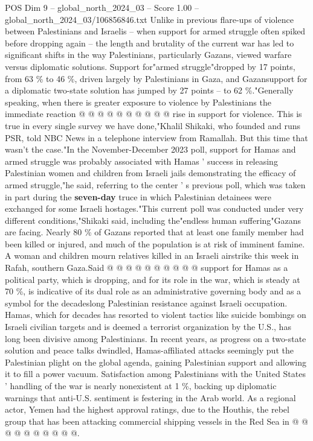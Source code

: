 \begin{textsample}{POS Dim 9 – global\_north\_2024\_03 – Score 1.00 – global\_north\_2024\_03/106856846.txt}
Unlike in previous flare-ups of violence between Palestinians and Israelis -- when support for armed struggle often spiked before dropping again -- the length and brutality of the current war has led to significant shifts in the way Palestinians, particularly Gazans, viewed warfare versus diplomatic solutions.
Support for"armed struggle"dropped by 17 points, from 63 \% to 46 \%, driven largely by Palestinians in Gaza, and Gazansupport for a diplomatic two-state solution has jumped by 27 points -- to 62 \%."Generally speaking, when there is greater exposure to violence by Palestinians the immediate reaction @ @ @ @ @ @ @ @ @ @ rise in support for violence.
This is true in every single survey we have done,"Khalil Shikaki, who founded and runs PSR, told NBC News in a telephone interview from Ramallah.
But this time that wasn't the case."In the November-December 2023 poll, support for Hamas and armed struggle was probably associated with Hamas ' success in releasing Palestinian women and children from Israeli jails demonstrating the efficacy of armed struggle,"he said, referring to the center ' s previous poll, which was taken in part during the \textbf{seven-day} truce in which Palestinian detainees were exchanged for some Israeli hostages."This current poll was conducted under very different conditions,"Shikaki said, including the"endless human suffering"Gazans are facing.
Nearly 80 \% of Gazans reported that at least one family member had been killed or injured, and much of the population is at risk of imminent famine.
A woman and children mourn relatives killed in an Israeli airstrike this week in Rafah, southern Gaza.Said @ @ @ @ @ @ @ @ @ @ support for Hamas as a political party, which is dropping, and for its role in the war, which is steady at 70 \%, is indicative of its dual role as an administrative governing body and as a symbol for the decadeslong Palestinian resistance against Israeli occupation.
Hamas, which for decades has resorted to violent tactics like suicide bombings on Israeli civilian targets and is deemed a terrorist organization by the U.S., has long been divisive among Palestinians.
In recent years, as progress on a two-state solution and peace talks dwindled, Hamas-affiliated attacks seemingly put the Palestinian plight on the global agenda, gaining Palestinian support and allowing it to fill a power vacuum.
Satisfaction among Palestinians with the United States ' handling of the war is nearly nonexistent at 1 \%, backing up diplomatic warnings that anti-U.S. sentiment is festering in the Arab world.
As a regional actor, Yemen had the highest approval ratings, due to the Houthis, the rebel group that has been attacking commercial shipping vessels in the Red Sea in @ @ @ @ @ @ @ @ @ @.

\end{textsample}
